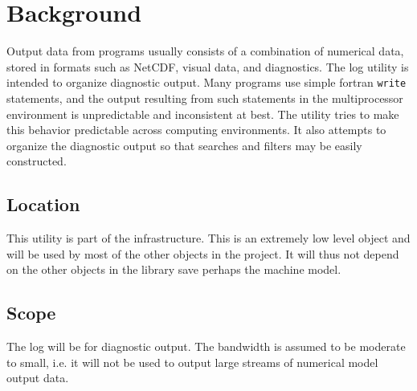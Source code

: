 
\section{Background}

Output data from programs usually consists of a combination of numerical data, stored
in formats such as NetCDF, visual data, and diagnostics.  The log utility is intended to 
organize diagnostic output.  Many programs use simple fortran {\tt write} statements,
and the output resulting from such statements in the multiprocessor environment is 
unpredictable and inconsistent at best.  The utility tries to make this behavior predictable
across computing environments.  It also attempts to organize the diagnostic output so
that searches and filters may be easily constructed.

\subsection{Location}

This utility is part of the infrastructure.  This is an extremely low level object and
will be used by most of the other objects in the project.  It will thus not depend on 
the other objects in the library save perhaps the machine model.

\subsection{Scope}

The log will be for diagnostic output.  The bandwidth is assumed to be moderate to small, i.e.
it will not be used to output large streams of numerical model output data.  



